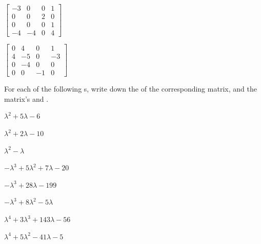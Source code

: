 \begin{exercise}
\begin{Parts}
\item \(\begin{bmatrix} -3 & 0 & 0 & 1
\\0 & 0 & 2 & 0
\\0 & 0 & 0 & 1
\\-4 & -4 & 0 & 4 \end{bmatrix}\)

\item \(\begin{bmatrix} 0 & 4 & 0 & 1
\\4 & -5 & 0 & -3
\\0 & -4 & 0 & 0
\\0 & 0 & -1 & 0 \end{bmatrix}\)

\end{Parts}
\end{exercise}








\begin{exercise}  
For each of the following s, write down the  of the corresponding matrix, and the matrix's  and .
\begin{Parts}
\item \(\lambda^2+5\lambda-6\)

\item \(\lambda^2+2\lambda-10\)

\begin{reduce}
\item \(\lambda^2-\lambda\)

\item \(-\lambda^3+5\lambda^2+7\lambda-20\)
\end{reduce}

\item \(-\lambda^3+28\lambda-199\)

\item \(-\lambda^3+8\lambda^2-5\lambda\)

\item \(\lambda^4+3\lambda^3+143\lambda-56\)

\item \(\lambda^4+5\lambda^2-41\lambda-5\)

\end{Parts}
\end{exercise}





